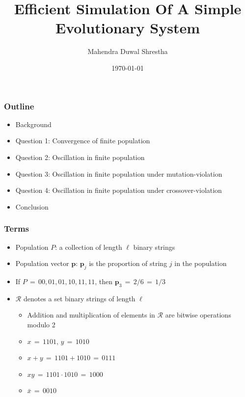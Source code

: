 \documentclass[aspectratio=169]{beamer}
\title{Efficient Simulation Of A Simple Evolutionary System}
\author{Mahendra Duwal Shrestha}
\institute{The University Of Tenessee}
\date{\today}
\begin{document}
  \begin{frame}
    \titlepage
  \end{frame}

  \begin{frame}
    \frametitle{Outline}
    \begin{itemize}
      \item{Background}
      \item{Question 1: Convergence of finite population}
      \item{Question 2: Oscillation in finite population}
      \item{Question 3: Oscillation in finite population under mutation-violation}
      \item{Question 4: Oscillation in finite population under crossover-violation}
      \item{Conclusion}
    \end{itemize}
  \end{frame}

  \begin{frame}
    \frametitle{Terms}
    \begin{itemize}
      \item{Population $P$: a collection of length $\ell$ binary strings}
      \item{Population vector $\bm{p}$: $\bm{p}_j$ is the proportion of string $j$ in the population}
      \item{If $P \,=\, {00, 01, 01, 10, 11, 11}$, then $\bm{p}_3 \,=\, 2/6 \,=\, 1/3$}
      \item{$\mathcal{R}$ denotes a set binary strings of length $\ell$ }
      \begin{itemize}
	\item{Addition and multiplication of elements in $\mathcal{R}$ are bitwise operations modulo 2}
	\item{$x \,=\, 1101,\, y \,=\, 1010 $}
	\item{$x + y \,=\, 1101 + 1010 \,=\, 0111$}
	\item{$xy \,=\, 1101 \cdot 1010 \,=\, 1000$}
	\item{$\bar{x} \,=\, 0010$}
      \end{itemize}
    \end{itemize}
  \end{frame}
  
\end{document}
